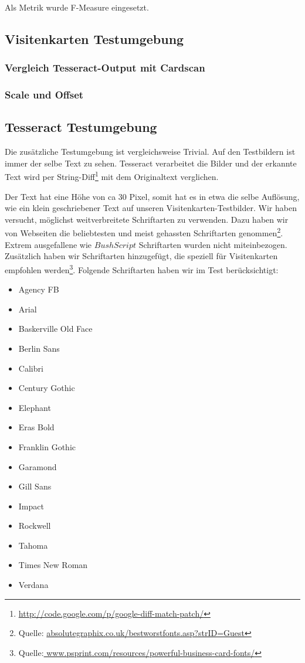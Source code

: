 \documentclass[10pt]{article}
\begin{document}
Als Metrik wurde F-Measure eingesetzt. 

\subsection{Visitenkarten Testumgebung}

\subsubsection{Vergleich Tesseract-Output mit Cardscan}

\subsubsection{Scale und Offset}

\subsection{Tesseract Testumgebung}\label{tessTestUmgebung}
Die zusätzliche Testumgebung ist vergleichsweise Trivial. Auf den Testbildern ist immer der selbe Text zu sehen. Tesseract verarbeitet die Bilder und der erkannte Text wird per String-Diff\footnote{\url{http://code.google.com/p/google-diff-match-patch/}} mit dem Originaltext verglichen.

Der Text hat eine Höhe von ca 30 Pixel, somit hat es in etwa die selbe Auflösung, wie ein klein geschriebener Text auf unseren Visitenkarten-Testbilder.
Wir haben versucht, möglichst weitverbreitete Schriftarten zu verwenden. Dazu haben wir von Webseiten die beliebtesten und meist gehassten Schriftarten genommen\footnote{Quelle: \url{absolutegraphix.co.uk/bestworstfonts.asp?strID=Guest}}. Extrem ausgefallene wie $Bush Script$ Schriftarten wurden nicht miteinbezogen.
Zusätzlich haben wir Schriftarten hinzugefügt, die speziell für Visitenkarten empfohlen werden\footnote{Quelle:\url{ www.psprint.com/resources/powerful-business-card-fonts/}}. Folgende Schriftarten haben wir im Test berücksichtigt:
\begin{itemize}
\item Agency FB
\item Arial
\item Baskerville Old Face
\item Berlin Sans
\item Calibri
\item Century Gothic
\item Elephant
\item Eras Bold
\item Franklin Gothic
\item Garamond
\item Gill Sans
\item Impact
\item Rockwell
\item Tahoma
\item Times New Roman
\item Verdana
\end{itemize}
\end{document}
